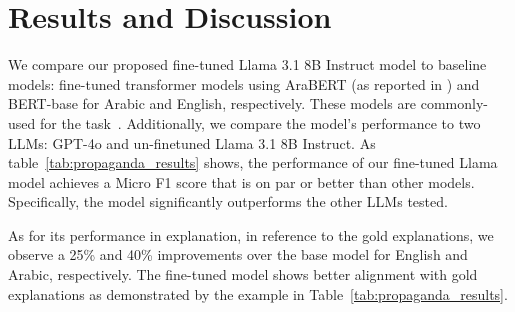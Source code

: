 \section{Results and Discussion}
\label{label:results}
\begin{table*}[]
\caption{Generated explanations by different models.}
\label{tab:exp_example}
\vspace{-0.3cm}
\end{table*}



We compare our proposed fine-tuned Llama 3.1 8B Instruct model to baseline models: fine-tuned transformer models using AraBERT (as reported in \citet{hasanain2024can}) and BERT-base for Arabic and English, respectively. These models are commonly-used for the task~\cite{hasanain-etal-2023-araieval}. Additionally, we compare the model's performance to two LLMs: GPT-4o and un-finetuned Llama 3.1 8B Instruct. As table~\ref{tab:propaganda_results} shows, the performance of our fine-tuned Llama model achieves a Micro F1 score that is on par or better than other models. Specifically, the model significantly outperforms the other LLMs tested.

As for its performance in explanation, in reference to the gold explanations, we observe a 25\% and 40\% improvements over the base model for English and Arabic, respectively. The fine-tuned model shows better alignment with gold explanations as demonstrated by the example in Table~\ref{tab:propaganda_results}.



